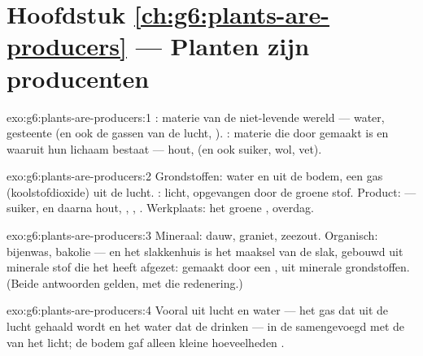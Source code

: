 \section*{Hoofdstuk \ref{ch:g6:plants-are-producers} --- Planten zijn producenten}

\begin{solution}{exo:g6:plants-are-producers:1}
: materie van de niet-levende wereld --- water, gesteente
(en ook de gassen van de lucht, ). :
materie die door  gemaakt is en waaruit hun lichaam bestaat
--- hout,  (en ook suiker, wol, vet).
\end{solution}

\begin{solution}{exo:g6:plants-are-producers:2}
Grondstoffen: water en  uit de bodem, een gas
(koolstofdioxide) uit de lucht. : licht, opgevangen door de groene
stof. Product:  --- suiker, en daarna hout, ,
, . Werkplaats: het groene , overdag.
\end{solution}

\begin{solution}{exo:g6:plants-are-producers:3}
Mineraal: dauw, graniet, zeezout. Organisch: bijenwas, bakolie --- en het
slakkenhuis is het maaksel van de slak, gebouwd uit minerale stof die het
 heeft afgezet: gemaakt door een , uit minerale
grondstoffen. (Beide antwoorden gelden, met die redenering.)
\end{solution}

\begin{solution}{exo:g6:plants-are-producers:4}
Vooral uit lucht en water --- het gas dat uit de lucht gehaald wordt en
het water dat de  drinken --- in de  samengevoegd met de
 van het licht; de bodem gaf alleen kleine hoeveelheden .
\end{solution}

